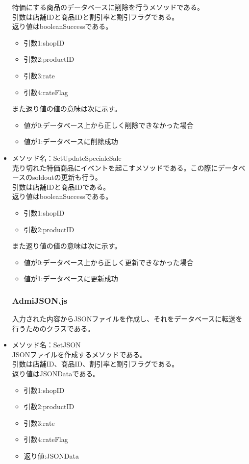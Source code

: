\documentclass[a4j]{jarticle}
\begin{document}
\begin{itemize}
特価にする商品のデータベースに削除を行うメソッドである。\\
引数は店舗IDと商品IDと割引率と割引フラグである。\\
返り値はbooleanSuccessである。
	\begin{itemize}
		\item 引数1:shopID
		\item 引数2:productID
		\item 引数3:rate
		\item 引数4:rateFlag
	\end{itemize}
また返り値の値の意味は次に示す。
	\begin{itemize}
		\item 値が0:データベース上から正しく削除できなかった場合
		\item 値が1:データベースに削除成功
	\end{itemize}
%
\item メソッド名：SetUpdateSpecialeSale\\

売り切れた特価商品にイベントを起こすメソッドである。この際にデータベースのsoldoutの更新も行う。\\
引数は店舗IDと商品IDである。\\
返り値はbooleanSuccessである。
	\begin{itemize}
		\item 引数1:shopID
		\item 引数2:productID

	\end{itemize}
また返り値の値の意味は次に示す。
	\begin{itemize}
		\item 値が0:データベース上から正しく更新できなかった場合
		\item 値が1:データベースに更新成功
	\end{itemize}

\subsubsection{AdmiJSON.js}

入力された内容からJSONファイルを作成し、それをデータベースに転送を行うためのクラスである。\\

\item メソッド名：SetJSON\\

JSONファイルを作成するメソッドである。\\
引数は店舗ID、商品ID、割引率と割引フラグである。\\
返り値はJSONDataである。
	\begin{itemize}
		\item 引数1:shopID
		\item 引数2:productID
		\item 引数3:rate
		\item 引数4:rateFlag
	\end{itemize}
	\begin{itemize}
		\item 返り値:JSONData
	\end{itemize}
\end{itemize}
\end{document}

